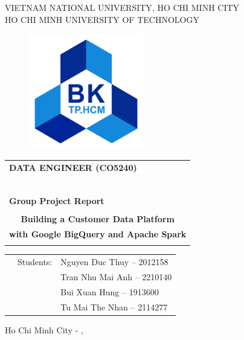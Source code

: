 \begin{titlepage}
\begin{center}
VIETNAM NATIONAL UNIVERSITY, HO CHI MINH CITY \\
HO CHI MINH UNIVERSITY OF TECHNOLOGY \\
\end{center}

\vspace{1cm}

\begin{figure}[h!]
\begin{center}
\includegraphics[width=5cm]{images/hcmut.png}
\end{center}
\end{figure}

\vspace{1cm}


\begin{center}
\begin{tabular}{c}
\multicolumn{1}{l}{\textbf{{\Large DATA ENGINEER (CO5240)}}}\\
~~\\
\hline
\\
\multicolumn{1}{l}{\textbf{{\Large Group Project Report}}}\\
\\
\textbf{{\Huge Building a Customer Data Platform}}\\
\textbf{{\Huge with Google BigQuery and Apache Spark}}\\
\\
\hline
\end{tabular}
\end{center}

\vspace{1.5cm}

\begin{table}[h]
\begin{tabular}{rrl}
\hspace{5 cm} & Students:   & Nguyen Duc Thuy           -- 2012158 \\
              &             & Tran Nhu Mai Anh          -- 2210140 \\
              &             & Bui Xuan Hung             -- 1913600 \\
              &             & Tu Mai The Nhan           -- 2114277


\end{tabular}
\end{table}
\vspace{1.5cm}
\begin{center}
{\footnotesize Ho Chi Minh City - \monthname[\the\month], \the\year}
\end{center}
\end{titlepage}
    
